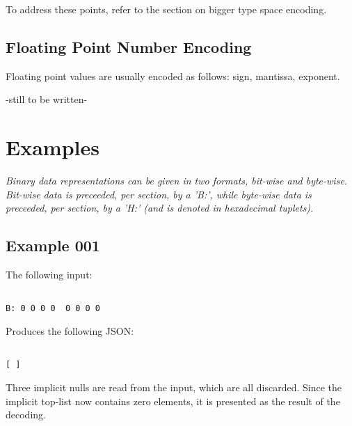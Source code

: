 To address these points, refer to the section on bigger type space
encoding.

\subsection{Floating Point Number Encoding}

Floating point values are usually encoded as follows: sign, mantissa, exponent.

-still to be written-

\section{Examples}

\textit{
Binary data representations can be given in two formats, bit-wise and byte-wise.
Bit-wise data is preceeded, per section, by a 'B:',
while byte-wise data is preceeded, per section, by a 'H:' (and is denoted in
hexadecimal tuplets).
}

\subsection{Example 001}

The following input:

\begin{changemargin}{-60mm}{0mm}
\begin{myquote}
\begin{verbatim}

B: 0 0 0 0  0 0 0 0

\end{verbatim}
\end{myquote}
\end{changemargin}

Produces the following JSON:

\begin{changemargin}{-60mm}{0mm}
\begin{myquote}
\begin{verbatim}

[ ]

\end{verbatim}
\end{myquote}
\end{changemargin}

Three implicit nulls are read from the input, which are all discarded.
Since the implicit top-list now contains zero elements, it is presented
as the result of the decoding.

